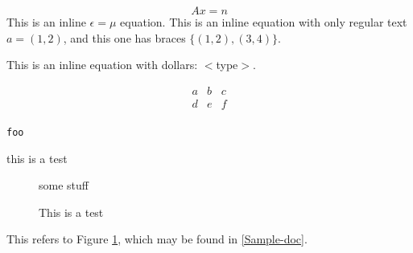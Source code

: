 \documentclass{article}
\begin{document}
$$
A x = n
$$
This is an inline $ \epsilon = \mu $ equation.  This is an inline equation
with only regular text $ a = ( 1,2 ) $, and this one has braces $ \{ (1,2),
(3,4)\} $.


This is an inline equation with dollars: {\sf $<$type$>$}.

\begin{eqnarray}
a & b & c \\
d & e & f \\
\end{eqnarray}
\begin{verbatim}
foo
\end{verbatim}
this is a test

\begin{figure}
some stuff
\caption{This is a test}\label{fig-foo}
\end{figure}

This refers to Figure \ref{fig-foo}, which may be found in \ref{Sample-doc}.
\end{document}
